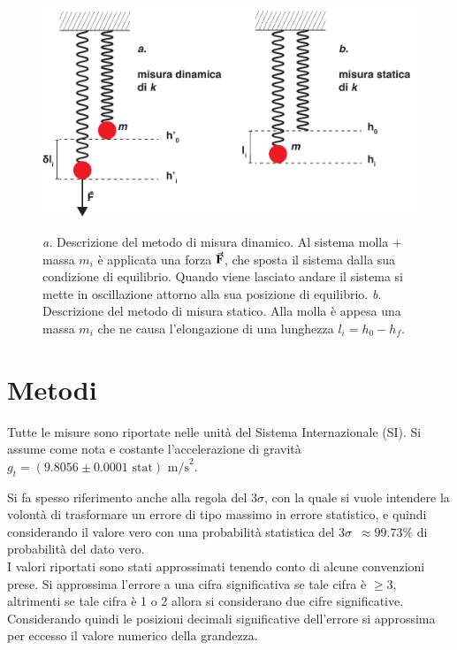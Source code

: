 \documentclass[italian, a4paper, 10pt, twocolumn]{../../style/lab_unige}
\newcommand{\gLab}{$g_t=(9.8056\pm0.0001 \text{ stat}) \text{ m/s}^2$\space}
\newcommand{\treSigma}{$3\sigma$\space}
\newcommand{\Li}[1]{$l_{#1}$}
\newcommand{\MassI}[1]{$m_{#1}$}
\begin{document}
    \begin{figure}[t]
        \centering
        \includegraphics[width=\linewidth]{system_horiz.pdf}
        \label{figure:methods}
        \caption{\textit{a.} Descrizione del metodo di misura dinamico. Al sistema molla + massa \MassI{i} è 
        applicata una forza $\va{F}$, che sposta il sistema dalla sua condizione di equilibrio. Quando viene 
        lasciato andare il sistema si mette in oscillazione attorno alla sua posizione di equilibrio.
        \textit{b.} Descrizione del metodo di misura statico. Alla molla è appesa una massa \MassI{i} che 
        ne causa l'elongazione di una lunghezza \Li{i}$=h_0-h_f$. 
        }
    \end{figure}

    \section{Metodi}
    \label{section:methods}
    Tutte le misure sono riportate nelle unità del Sistema Internazionale (SI). Si assume come nota e costante 
    l'accelerazione di gravità \gLab .

    
    Si fa spesso riferimento anche alla regola del \treSigma, con la quale si vuole intendere la volontà di 
    trasformare un errore di tipo massimo in errore statistico, e quindi considerando il valore vero con una
    probabilità statistica del \treSigma~$\approx99.73\%$ di probabilità del dato vero.\\
    I valori riportati sono stati approssimati tenendo conto di alcune convenzioni prese. Si approssima 
    l'errore a una cifra significativa se tale cifra è $\geqslant3$, altrimenti se tale cifra è 1 o 2 allora
    si considerano due cifre significative. Considerando quindi le posizioni decimali significative dell'errore
    si approssima per eccesso il valore numerico della grandezza. 
\end{document}
